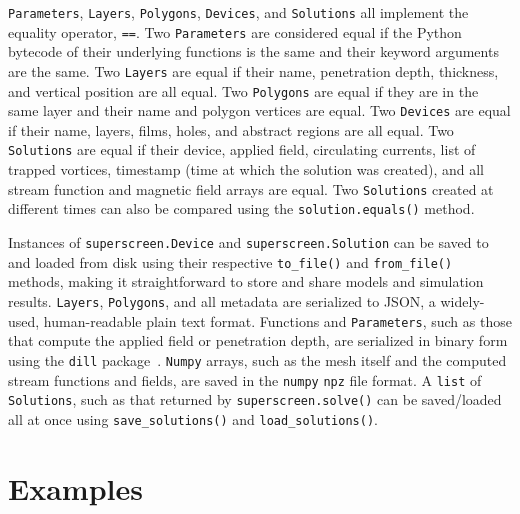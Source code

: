 \documentclass[final,3p,times,twocolumn]{elsarticle}
\newcommand{\inline}[1]{\texttt{#1}\xspace}
\begin{document}
\inline{Parameters}, \inline{Layers}, \inline{Polygons}, \inline{Devices}, and \inline{Solutions} all implement the equality operator, \inline{==}. Two \inline{Parameters} are considered equal if the Python bytecode of their underlying functions is the same and their keyword arguments are the same. Two \inline{Layers} are equal if their name, penetration depth, thickness, and vertical position are all equal. Two \inline{Polygons} are equal if they are in the same layer and their name and polygon vertices are equal. Two \inline{Devices} are equal if their name, layers, films, holes, and abstract regions are all equal. Two \inline{Solutions} are equal if their device, applied field, circulating currents, list of trapped vortices, timestamp (time at which the solution was created), and all stream function and magnetic field arrays are equal. Two \inline{Solutions} created at different times can also be compared using the  \inline{solution.equals()} method.

Instances of \inline{superscreen.Device} and \inline{superscreen.Solution} can be saved to and loaded from disk using their respective \inline{to_file()} and \inline{from_file()} methods, making it straightforward to store and share models and simulation results. \inline{Layers}, \inline{Polygons}, and all metadata are serialized to JSON, a widely-used, human-readable plain text format. Functions and \inline{Parameters}, such as those that compute the applied field or penetration depth, are serialized in binary form using the \inline{dill} package~\cite{McKerns}. \inline{Numpy} arrays, such as the mesh itself and the computed stream functions and fields, are saved in the \inline{numpy} \inline{npz} file format. A \inline{list} of \inline{Solutions}, such as that returned by \inline{superscreen.solve()} can be saved/loaded all at once using \inline{save_solutions()} and \inline{load_solutions()}.

\section{Examples}
\label{section:examples}
\end{document}

